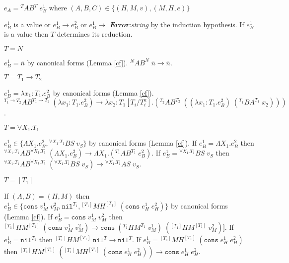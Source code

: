 \begin{case}
\label{ab}
$e_{A}={^{T}A}B^{T}\;e_{B}^{1}$ where $(A,B,C)\in\lbrace(H,M,v),(M,H,e)\rbrace$

$e_{B}^{1}$ is a value or $e_{B}^{1}\rightarrow e_{B}^{2}$ or $e_{B}^{1}\rightarrow$ \emph{\textbf{Error}:\;string} by the induction hypothesis.  If $e_{B}^{1}$ is a value then $T$ determines its reduction.
\begin{subcase}
$T=N$

$e_{B}^{1}=\overline{n}$ by canonical forms (Lemma \ref{cf}).  $^{N}AB^{N}\;\overline{n}\rightarrow\overline{n}$.
\end{subcase}
\begin{subcase}
$T=T_{1}\rightarrow T_{2}$

$e_{B}^{1}=\lambda x_{1}:T_{1}.e_{B}^{2}$ by canonical forms (Lemma \ref{cf}).  $^{T_{1}\rightarrow T_{2}}AB^{T_{1}\rightarrow T_{2}}\;(\lambda x_{1}:T_{1}.e_{B}^{2})\rightarrow\lambda x_{2}:T_{1}[T_{i}/T^{a}_{i}].(^{T_{2}}AB^{T_{2}}\;((\lambda x_{1}:T_{1}.e_{B}^{2})\;(^{T_{1}}BA^{T_{1}}\;x_{2})))$.
\end{subcase}
\begin{subcase}
$T=\forall X_{1}.T_{1}$

$e_{B}^{1}\in\lbrace\Lambda X_{1}.e_{B}^{2},{^{\forall X_{1}.T_{1}}B}S\;v_{S}\rbrace$ by canonical forms (Lemma \ref{cf}).  If $e_{B}^{1}=\Lambda X_{1}.e_{B}^{2}$ then $^{\forall X_{1}.T_{1}}AB^{\forall X_{1}.T_{1}}\;(\Lambda X_{1}.e_{B}^{2})\rightarrow\Lambda X_{1}.(^{T_{1}}AB^{T_{1}}\;e_{B}^{2})$.  If $e_{B}^{1}={^{\forall X_{1}.T_{1}}B}S\;v_{S}$ then $^{\forall X_{1}.T_{1}}AB^{\forall X_{1}.T_{1}}\;(^{\forall X_{1}.T_{1}}BS\;v_{S})\rightarrow{^{\forall X_{1}.T_{1}}A}S\;v_{S}$.
\end{subcase}
\begin{subcase}
$T=[T_{1}]$

If $(A,B)=(H,M)$ then $e_{B}^{1}\in\lbrace\mathtt{cons}\;v_{M}^{1}\;v_{M}^{2},\mathtt{nil}^{T_{1}},{^{[T_{1}]}M}H^{[T_{1}]}\;(\mathtt{cons}\;e_{H}^{1}\;e_{H}^{2})\rbrace$ by canonical forms (Lemma \ref{cf}).  If $e_{B}^{1}=\mathtt{cons}\;v_{M}^{1}\;v_{M}^{2}$ then $^{[T_{1}]}HM^{[T_{1}]}\;(\mathtt{cons}\;v_{M}^{1}\;v_{M}^{2})\rightarrow\mathtt{cons}\;(^{T_{1}}HM^{T_{1}}\;v_{M}^{1})\;(^{[T_{1}]}HM^{[T_{1}]}\;v_{M}^{2})]$.  If $e_{B}^{1}=\mathtt{nil}^{T_{1}}$ then $^{[T_{1}]}HM^{[T_{1}]}\;\mathtt{nil}^{T}\rightarrow\mathtt{nil}^{T}$.  If $e_{B}^{1}={^{[T_{1}]}M}H^{[T_{1}]}\;(\mathtt{cons}\;e_{H}^{1}\;e_{H}^{2})$ then $^{[T_{1}]}HM^{[T_{1}]}\;(^{[T_{1}]}MH^{[T_{1}]}\;(\mathtt{cons}\;e_{H}^{1}\;e_{H}^{2}))\rightarrow\mathtt{cons}\;e_{H}^{1}\;e_{H}^{2}$.


\end{subcase}
\end{case}
